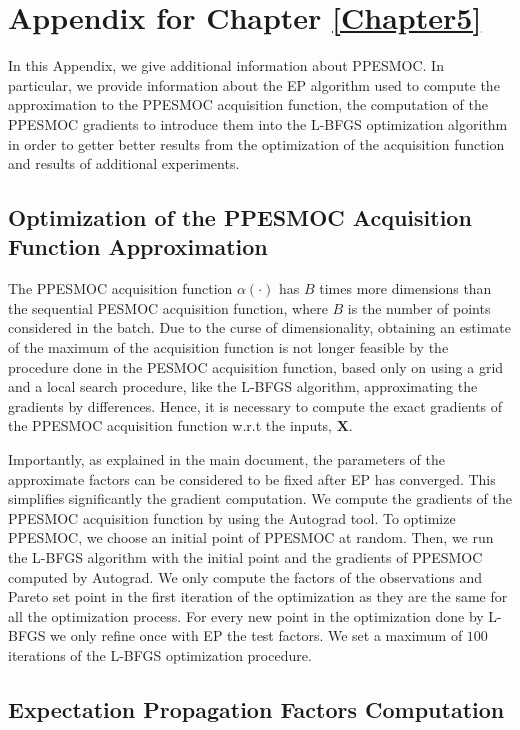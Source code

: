 
\chapter{Appendix for Chapter \ref{Chapter5}}
\label{AppendixC}

In this Appendix, we give additional information about PPESMOC. In particular, we provide information about the EP algorithm used to compute the approximation to the PPESMOC acquisition function, the computation of the PPESMOC gradients to introduce them into the L-BFGS optimization algorithm in order to getter better results from the optimization of the acquisition function and results of additional experiments.

\section{Optimization of the PPESMOC Acquisition Function Approximation}
The PPESMOC acquisition function $\alpha(\cdot)$ has $B$ times more dimensions than the sequential PESMOC acquisition function, where $B$ is the number of points considered in the batch. Due to the curse of dimensionality, obtaining an estimate of the maximum of the acquisition function is not longer feasible by the procedure done in the PESMOC acquisition function, based only on using a grid and a local search procedure, like the L-BFGS algorithm, approximating the gradients by differences. Hence, it is necessary to compute the exact gradients of the PPESMOC acquisition function w.r.t the inputs, $\mathbf{X}$.

Importantly, as explained in the main document, the parameters of the approximate factors can be considered to be fixed after EP has converged. This simplifies significantly the gradient computation. We compute the gradients of the PPESMOC acquisition function by using the Autograd tool. To optimize PPESMOC, we choose an initial point of PPESMOC at random. Then, we run the L-BFGS algorithm with the initial point and the gradients of PPESMOC computed by Autograd. We only compute the factors of the observations and Pareto set point in the first iteration of the optimization as they are the same for all the optimization process. For every new point in the optimization done by L-BFGS we only refine once with EP the test factors. We set a maximum of $100$ iterations of the L-BFGS optimization procedure.

\section{Expectation Propagation Factors Computation}

